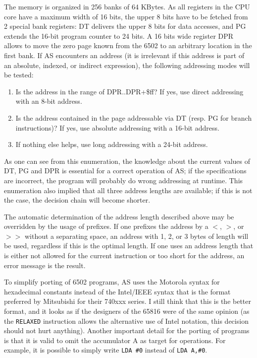 \documentclass[12pt,twoside]{report}
\newcommand{\tty}[1]{{\tt #1}}
\newcommand{\asname}{{AS}}
\begin{document}
The memory is organized in 256 banks of 64 KBytes.  As all registers
in the CPU core have a maximum width of 16 bits, the upper 8 bits
have to be fetched from 2 special bank registers: DT delivers the
upper 8 bits for data accesses, and PG extends the 16-bit program
counter to 24 bits.  A 16 bits wide register DPR allows to move the
zero page known from the 6502 to an arbitrary location in the first
bank.  If \asname{} encounters an address (it is irrelevant if this address
is part of an absolute, indexed, or indirect expression), the
following addressing modes will be tested:
\begin{enumerate}
\item{Is the address in the range of DPR..DPR+\$ff?  If yes, use direct
      addressing with an 8-bit address.}
\item{Is the address contained in the page addressable via DT (resp.
      PG for branch instructions)? If yes, use absolute addressing
      with a 16-bit address.}
\item{If nothing else helps, use long addressing with a 24-bit
      address.}
\end{enumerate}
As one can see from this enumeration, the knowledge about the current
values of DT, PG and DPR is essential for a correct operation of \asname{};
if the specifications are incorrect, the program will probably do
wrong addressing at runtime.  This enumeration also implied that all
three address lengths are available; if this is not the case, the
decision chain will become shorter.

The automatic determination of the address length described above may
be overridden by the usage of prefixes.  If one prefixes the address
by a $<$, $>$, or $>>$ without a separating space, an address with 1, 2, or
3 bytes of length will be used, regardless if this is the optimal
length.  If one uses an address length that is either not allowed for
the current instruction or too short for the address, an error
message is the result.

To simplify porting of 6502 programs, \asname{} uses the Motorola syntax for
hexadecimal constants instead of the Intel/IEEE syntax that is
the format preferred by Mitsubishi for their 740xxx series.  I still
think that this is the better format, and it looks as if the
designers of the 65816 were of the same opinion (as the \tty{RELAXED}
instruction allows the alternative use of Intel notation, this
decision should not hurt anything).  Another important detail for the
porting of programs is that it is valid to omit the accumulator A as
target for operations.  For example, it is possible to simply write
\verb!LDA #0! instead of \verb!LDA A,#0!.
\end{document}
